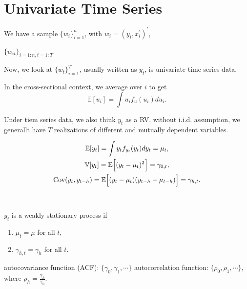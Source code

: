 \section{Univariate Time Series}

We have a sample $\{w_i\}_{i=1}^n$, with $w_i = (y_i, x_i^{\prime})^{\prime}$, 

$\{w_{it}\}_{i=1:n, t=1:T}$.

Now, we look at $\{w_t\}_{i=1}^T$, usually written as $y_t$, is univariate time series data.

In the cross-sectional context, we average over $i$ to get 
\[\mathbb{E}[u_i] = \int u_i f_u(u_i) d u_i.\]

Under tiem series data, we also think $y_t$ as a RV. without i.i.d. assumption,
we generallt have $T$ realizations of different and mutually dependent variables.

\begin{gather*}
    \mathbb{E}[y_t] = \int y_t f_{y_t}(y_t) d y_t = \mu_t, \\
    \mathbb{V}[y_t] = \mathbb{E}\Bigl[(y_t - \mu_t)^2 \Bigr] = \gamma_{0,t}, \\
    \operatorname{Cov}(y_t, y_{t-h}) = \mathbb{E}\Bigl[ (y_t - \mu_t)(y_{t-h} - \mu_{t-h}  ) \Bigr] = \gamma_{h,t}.
\end{gather*}

\begin{definition}\label{def:weak-stationarity}
    \

    $y_t$ is a weakly stationary process if
    \begin{enumerate}
        \item $\mu_t = \mu$ for all $t$,
        \item $\gamma_{h,t} = \gamma_h$ for all $t$.
    \end{enumerate}
    autocovariance function (ACF): $\{\gamma_0, \gamma_1, \cdots\}$
    autocorrelation function: $\{\rho_0, \rho_1, \cdots \}$, where $\rho_h = \frac{\gamma_h}{\gamma_0}$.
\end{definition}

